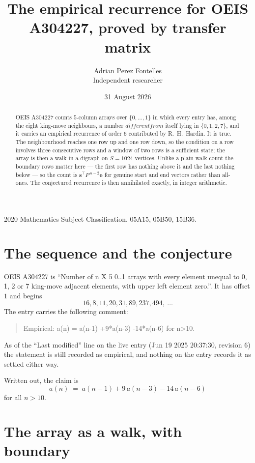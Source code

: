 \documentclass[11pt,a4paper]{article}
\title{The empirical recurrence for OEIS A304227, proved by transfer matrix}
\author{Adrian Perez Fontelles\\ \small Independent researcher}
\date{31 August 2026}
\theoremstyle{plain}
\theoremstyle{definition}
\begin{document}
\maketitle

\begin{abstract}
OEIS A304227 counts $5$-column arrays over $\{0,\dots,1\}$ in which every entry has,
among the eight king-move neighbours, a number $different from$ itself lying in $\{0,1,2,7\}$, and it carries an empirical
recurrence of order $6$ contributed by R.~H.~Hardin. It is true. The neighbourhood
reaches one row up and one row down, so the condition on a row involves three consecutive
rows and a window of two rows is a sufficient state; the array is then a walk in a digraph
on $S=1024$ vertices. Unlike a plain walk count the boundary rows matter here --- the first
row has nothing above it and the last nothing below --- so the count is
$\mathbf{s}^{\!\top}P^{\,n-2}\mathbf{e}$ for genuine start and end vectors rather than
all-ones. The conjectured recurrence is then annihilated exactly, in integer arithmetic.
\end{abstract}

\noindent\small 2020 Mathematics Subject Classification. 05A15, 05B50, 15B36.\normalsize

\section{The sequence and the conjecture}

OEIS A304227 is ``Number of n X 5 0..1 arrays with every element unequal to 0, 1, 2 or 7 king-move adjacent elements, with upper left element zero.''. It has offset
$1$ and begins
\[
16, 8, 11, 20, 31, 89, 237, 494,\ \dots
\]
The entry carries the following comment:
\begin{quote}\small
Empirical: a(n) = a(n-1) +9*a(n-3) -14*a(n-6) for n>10.
\end{quote}
As of the ``Last modified'' line on the live entry (Jun 19 2025 20:37:30, revision
6) the statement is still recorded as empirical, and nothing on the entry
records it as settled either way.

Written out, the claim is
\begin{equation}\label{eq:conj}
a(n)\;=\;a(n-1) + 9\,a(n-3) - 14\,a(n-6)
\end{equation}
for all $n>10$.

\section{The array as a walk, with boundary}
\end{document}
